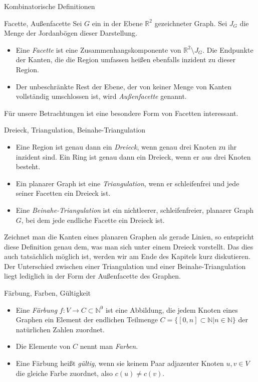 \begin{section}{Kombinatorische Definitionen}
  \begin{definition}{Facette, Außenfacette}
   Sei $G$ ein in der Ebene $\mathbb{R}^2$ gezeichneter Graph. Sei $J_G$ die Menge der Jordanbögen dieser Darstellung.
   \begin{itemize}
   \item Eine \textit{Facette} ist eine Zusammenhangskomponente von $\mathbb{R}^2 \setminus J_G$. Die Endpunkte der Kanten, die die Region umfassen heißen ebenfalls inzident zu dieser Region. 
   \item Der unbeschränkte Rest der Ebene, der von keiner Menge von Kanten vollständig umschlossen ist, wird \textit{Außenfacette} genannt.
   \end{itemize}
  \end{definition}
  
  Für unsere Betrachtungen ist eine besondere Form von Facetten interessant. 
  
  \begin{definition}{Dreieck, Triangulation, Beinahe-Triangulation}
   \-\ 
   \begin{itemize}
   \item Eine Region ist genau dann ein \textit{Dreieck}, wenn genau drei Knoten zu ihr inzident sind. Ein Ring ist genau dann ein Dreieck, wenn er aus drei Knoten besteht.
   \item Ein planarer Graph ist eine \textit{Triangulation}, wenn er schleifenfrei und jede seiner Facetten ein Dreieck ist. 
   \item Eine \textit{Beinahe-Triangulation} ist ein nichtleerer, schleifenfreier, planarer Graph $G$, bei dem jede endliche Facette ein Dreieck ist. 
   \end{itemize}
  \end{definition}
  
  Zeichnet man die Kanten eines planaren Graphen als gerade Linien, so entspricht diese Definition genau dem, was man sich unter einem Dreieck vorstellt. Das dies auch tatsächlich möglich ist, werden wir am Ende des Kapitels kurz diskutieren. Der Unterschied zwischen einer Triangulation und einer Beinahe-Triangulation liegt lediglich in der Form der Außenfacette des Graphen. 
 
  \begin{definition}{Färbung, Farben, Gültigkeit}
   \-\ 
   \begin{itemize}
   \item Eine \textit{Färbung} $f: V \rightarrow C \subset \mathbb{N}^0$ ist eine Abbildung, die jedem Knoten eines Graphen ein Element der endlichen Teilmenge $C = \{[0,n] \subset \mathbb{N}| n \in \mathbb{N}\}$ der natürlichen Zahlen zuordnet. 
   \item Die Elemente von $C$ nennt man \textit{Farben}. 
   \item Eine Färbung heißt \textit{gültig}, wenn sie keinem Paar adjazenter Knoten $u,v \in V$ die gleiche Farbe zuordnet, also $c(u) \neq c(v)$. 
   \end{itemize}
  \end{definition}
  

\end{section}
